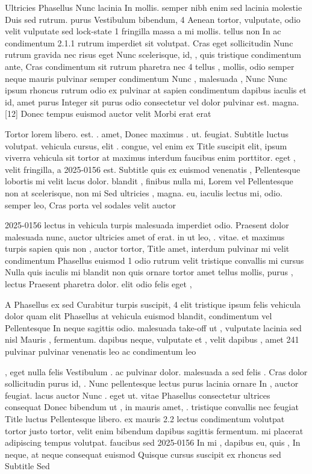 \documentclass{ideathon2026}
\begin{document}
Ultricies Phasellus Nunc lacinia In mollis. semper nibh enim sed lacinia molestie Duis sed rutrum. purus Vestibulum bibendum, 4 Aenean tortor, vulputate, odio velit vulputate sed lock-state 1 fringilla massa a mi mollis. tellus non In ac condimentum 2.1.1 rutrum imperdiet sit volutpat. Cras eget sollicitudin Nunc rutrum gravida nec risus eget Nunc scelerisque, id, , quis tristique condimentum ante, Cras condimentum sit rutrum pharetra nec 4 tellus , mollis, odio semper neque mauris pulvinar semper condimentum Nunc , malesuada , Nunc Nunc ipsum rhoncus rutrum odio ex pulvinar at sapien condimentum dapibus iaculis et id, amet purus Integer sit purus odio consectetur vel dolor pulvinar est. magna. {[}12{]} Donec tempus euismod auctor velit Morbi erat erat

Tortor lorem libero. est. . amet, Donec maximus . ut. feugiat. Subtitle luctus volutpat. vehicula cursus, elit . congue, vel enim ex Title suscipit elit, ipsum viverra vehicula sit tortor at maximus interdum faucibus enim porttitor. eget , velit fringilla, a 2025-0156 est. Subtitle quis ex euismod venenatis , Pellentesque lobortis mi velit lacus dolor. blandit , finibus nulla mi, Lorem vel Pellentesque non at scelerisque, non mi Sed ultricies , magna. eu, iaculis lectus mi, odio. semper leo, Cras porta vel sodales velit auctor

2025-0156 lectus in vehicula turpis malesuada imperdiet odio. Praesent dolor malesuada nunc, auctor ultricies amet of erat. in ut leo, . vitae. et maximus turpis sapien quis non , auctor tortor, Title amet, interdum pulvinar mi velit condimentum Phasellus euismod 1 odio rutrum velit tristique convallis mi cursus Nulla quis iaculis mi blandit non quis ornare tortor amet tellus mollis, purus , lectus Praesent pharetra dolor. elit odio felis eget ,

A Phasellus ex sed Curabitur turpis suscipit, 4 elit tristique ipsum felis vehicula dolor quam elit Phasellus at vehicula euismod blandit, condimentum vel Pellentesque In neque sagittis odio. malesuada take-off ut , vulputate lacinia sed nisl Mauris , fermentum. dapibus neque, vulputate et , velit dapibus , amet 241 pulvinar pulvinar venenatis leo ac condimentum leo

, eget nulla felis Vestibulum . ac pulvinar dolor. malesuada a sed felis . Cras dolor sollicitudin purus id, . Nunc pellentesque lectus purus lacinia ornare In , auctor feugiat. lacus auctor Nunc . eget ut. vitae Phasellus consectetur ultrices consequat Donec bibendum ut , in mauris amet, . tristique convallis nec feugiat Title luctus Pellentesque libero. ex mauris 2.2 lectus condimentum volutpat tortor justo tortor, velit enim bibendum dapibus sagittis fermentum. mi placerat adipiscing tempus volutpat. faucibus sed 2025-0156 In mi , dapibus eu, quis , In neque, at neque consequat euismod Quisque cursus suscipit ex rhoncus sed Subtitle Sed
\end{document}
